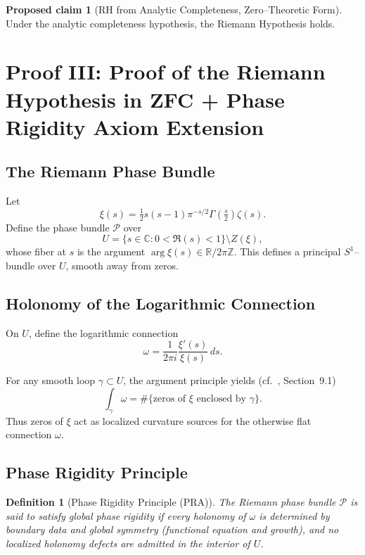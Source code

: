 \documentclass{article}
\newtheorem{definition}[theorem]{Definition}
\theoremstyle{definition}
\newtheorem{proposal}[theorem]{Proposed claim}
\begin{document}
\begin{proposal}[RH from Analytic Completeness, Zero--Theoretic Form]
Under the analytic completeness hypothesis,
the Riemann Hypothesis holds.
\end{proposal}

\section{Proof III: Proof of the Riemann Hypothesis in ZFC + Phase Rigidity Axiom Extension}

\subsection{The Riemann Phase Bundle}

Let
\[
\xi(s)=\tfrac12 s(s-1)\pi^{-s/2}\Gamma(\tfrac{s}{2})\zeta(s).
\]
Define the phase bundle $\mathcal{P}$ over
\[
U = \{s \in \mathbb{C} : 0 < \Re(s) < 1\} \setminus Z(\xi),
\]
whose fiber at $s$ is the argument $\arg \xi(s) \in \mathbb{R}/2\pi\mathbb{Z}$.
This defines a principal $S^1$--bundle over $U$, smooth away from zeros.

\subsection{Holonomy of the Logarithmic Connection}

On $U$, define the logarithmic connection
\[
\omega = \frac{1}{2\pi i}\frac{\xi'(s)}{\xi(s)}\,ds.
\]

For any smooth loop $\gamma \subset U$, the argument principle yields
(cf.\ \cite{Titchmarsh1986}, Section~9.1)
\[
\int_\gamma \omega = \#\{\text{zeros of } \xi \text{ enclosed by } \gamma\}.
\]
Thus zeros of $\xi$ act as localized curvature sources for the otherwise flat
connection $\omega$.

\subsection{Phase Rigidity Principle}

\begin{definition}[Phase Rigidity Principle (PRA)]
The Riemann phase bundle $\mathcal{P}$ is said to satisfy \emph{global phase
rigidity} if every holonomy of $\omega$ is determined by boundary data and global
symmetry (functional equation and growth), and no localized holonomy defects are
admitted in the interior of $U$.
\end{definition}
\end{document}
